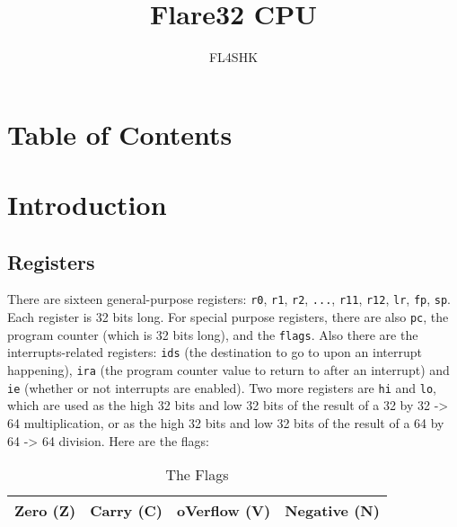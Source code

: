 \documentclass{article}
\title{Flare32 CPU}
\author{FL4SHK}
\makeatletter
\renewcommand\tableofcontents{%
    \@starttoc{toc}%
}
\makeatother
\begin{document}
	\maketitle
	\newpage



	\newpage
	\singlespacing
	\section{Table of Contents}
	\tableofcontents
	\newpage

	\doublespacing
	\section{Introduction}
	\subsection{Registers}
	There are sixteen general-purpose registers:  \texttt{r0}, \texttt{r1},
	\texttt{r2}, \texttt{...}, \texttt{r11}, \texttt{r12}, \texttt{lr},
	\texttt{fp}, \texttt{sp}.  Each register
	is 32 bits long.  For special purpose registers, there are also
	\texttt{pc}, the program counter (which is 32 bits long), and the
	\texttt{flags}.  Also there are the interrupts-related registers:
	\texttt{ids} (the destination to go to upon an interrupt happening),
	\texttt{ira} (the program counter value to return to after an
	interrupt) and \texttt{ie} (whether or not interrupts are enabled).
	Two more registers are \texttt{hi} and \texttt{lo}, which are used as
	the high 32 bits and low 32 bits of the result of a 32 by 32 -> 64
	multiplication, or as the high 32 bits and low 32 bits of the result of
	a 64 by 64 -> 64 division.  Here are the flags:

	\begin{table}[H]
		\begin{center}
			\caption{The Flags}
			\label{tab:flags}
			\begin{tabular}{|c|c|c|c|}
				\hline
				Zero (Z) & Carry (C) & oVerflow (V) & Negative (N)\\
				\hline
			\end{tabular}
		\end{center}
	\end{table}
\end{document}
